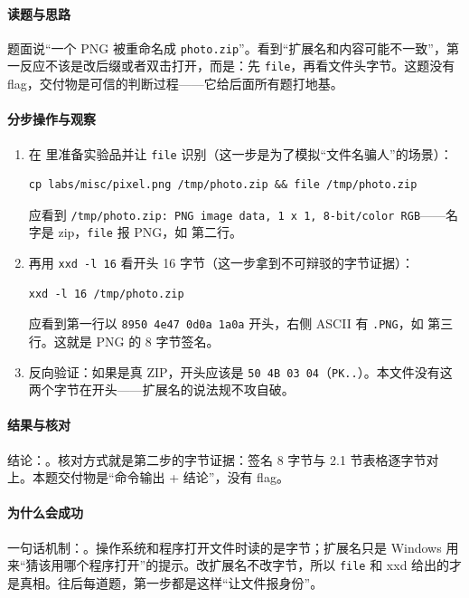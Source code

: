 \documentclass[UTF8,12pt,oneside]{ctexbook}
\begin{document}
\paragraph{读题与思路}
题面说“一个 PNG 被重命名成 \verb|photo.zip|”。看到“扩展名和内容可能不一致”，第一反应不该是改后缀或者双击打开，而是：先 \verb|file|，再看文件头字节。这题没有 flag，交付物是可信的判断过程——它给后面所有题打地基。

\paragraph{分步操作与观察}
\begin{enumerate}[label=\arabic*.]
\item 在  里准备实验品并让 \verb|file| 识别（这一步是为了模拟“文件名骗人”的场景）：
\begin{lstlisting}
cp labs/misc/pixel.png /tmp/photo.zip && file /tmp/photo.zip
\end{lstlisting}
应看到 \verb|/tmp/photo.zip: PNG image data, 1 x 1, 8-bit/color RGB|——名字是 zip，\verb|file| 报 PNG，如 第二行。
\item 再用 \verb|xxd -l 16| 看开头 16 字节（这一步拿到不可辩驳的字节证据）：
\begin{lstlisting}
xxd -l 16 /tmp/photo.zip
\end{lstlisting}
应看到第一行以 \verb|8950 4e47 0d0a 1a0a| 开头，右侧 ASCII 有 \verb|.PNG|，如 第三行。这就是 PNG 的 8 字节签名。
\item 反向验证：如果是真 ZIP，开头应该是 \verb|50 4B 03 04|（\verb|PK..|）。本文件没有这两个字节在开头——扩展名的说法规不攻自破。
\end{enumerate}

\paragraph{结果与核对}
结论：。核对方式就是第二步的字节证据：签名 8 字节与 2.1 节表格逐字节对上。本题交付物是“命令输出 + 结论”，没有 flag。

\paragraph{为什么会成功}
一句话机制：。操作系统和程序打开文件时读的是字节；扩展名只是 Windows 用来“猜该用哪个程序打开”的提示。改扩展名不改字节，所以 \verb|file| 和 xxd 给出的才是真相。往后每道题，第一步都是这样“让文件报身份”。
\end{document}
